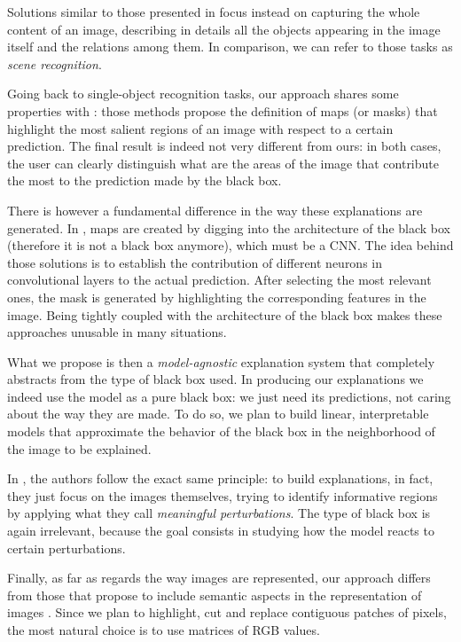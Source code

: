 \documentclass[12pt, twoside, a4paper]{report}
\begin{document}
Solutions similar to those presented in \cite{show-and-tell, show_attend_and_tell} focus instead on capturing the whole content of an image, describing in details all the objects appearing in the image itself and the relations among them. In comparison, we can refer to those tasks as \textit{scene recognition}.

Going back to single-object recognition tasks, our approach shares some properties with \cite{gradcam, neural-attention, zhou}: those methods propose the definition of maps (or masks) that highlight the most salient regions of an image with respect to a certain prediction. The final result is indeed not very different from ours: in both cases, the user can clearly distinguish what are the areas of the image that contribute the most to the prediction made by the black box. 

There is however a fundamental difference in the way these explanations are generated. In \cite{gradcam, neural-attention, zhou}, maps are created by digging into the architecture of the black box (therefore it is not a black box anymore), which must be a CNN. The idea behind those solutions is to establish the contribution of different neurons in convolutional layers to the actual prediction. After selecting the most relevant ones, the mask is generated by highlighting the corresponding features in the image. 
Being tightly coupled with the architecture of the black box makes these approaches unusable in many situations.

What we propose is then a \textit{model-agnostic} explanation system that completely abstracts from the type of black box used. In producing our explanations we indeed use the model as a pure black box: we just need its predictions, not caring about the way they are made.
To do so, we plan to build linear, interpretable models that approximate the behavior of the black box in the neighborhood of the image to be explained.

In \cite{fong}, the authors follow the exact same principle: to build explanations, in fact, they just focus on the images themselves, trying to identify informative regions by applying what they call \textit{meaningful perturbations}. The type of black box is again irrelevant, because the goal consists in studying how the model reacts to certain perturbations.

Finally, as far as regards the way images are represented, our approach differs from those that propose to include semantic aspects in the representation of images \cite{bag-of-keypoints, yang-visual-words, yang2-visual-words, old-visual-words, visual-word-reconstruction, bag-of-pixels, visual-bag-of-words}. Since we plan to highlight, cut and replace contiguous patches of pixels, the most natural choice is to use matrices of RGB values.
\end{document}

